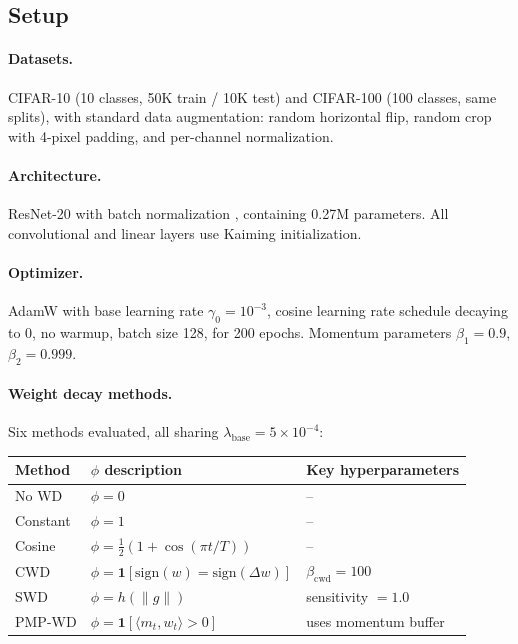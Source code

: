 \documentclass{article}
\begin{document}
\subsection{Setup}

\paragraph{Datasets.} CIFAR-10 (10 classes, 50K train / 10K test) and CIFAR-100 (100 classes, same splits), with standard data augmentation: random horizontal flip, random crop with 4-pixel padding, and per-channel normalization.

\paragraph{Architecture.} ResNet-20 with batch normalization \citep{he2016resnet}, containing 0.27M parameters. All convolutional and linear layers use Kaiming initialization.

\paragraph{Optimizer.} AdamW with base learning rate $\gamma_0 = 10^{-3}$, cosine learning rate schedule decaying to 0, no warmup, batch size 128, for 200 epochs. Momentum parameters $\beta_1 = 0.9$, $\beta_2 = 0.999$.

\paragraph{Weight decay methods.} Six methods evaluated, all sharing $\lambda_{\text{base}} = 5 \times 10^{-4}$:

\begin{table}[h]
\centering
\small
\begin{tabular}{lll}
\toprule
Method & $\phi$ description & Key hyperparameters \\
\midrule
No WD & $\phi = 0$ & -- \\
Constant & $\phi = 1$ & -- \\
Cosine & $\phi = \tfrac{1}{2}(1 + \cos(\pi t/T))$ & -- \\
CWD & $\phi = \mathbf{1}[\text{sign}(w) = \text{sign}(\Delta w)]$ & $\beta_{\text{cwd}} = 100$ \\
SWD & $\phi = h(\|g\|)$ & sensitivity $= 1.0$ \\
PMP-WD & $\phi = \mathbf{1}[\langle m_t, w_t \rangle > 0]$ & uses momentum buffer \\
\bottomrule
\end{tabular}
\end{table}
\end{document}
